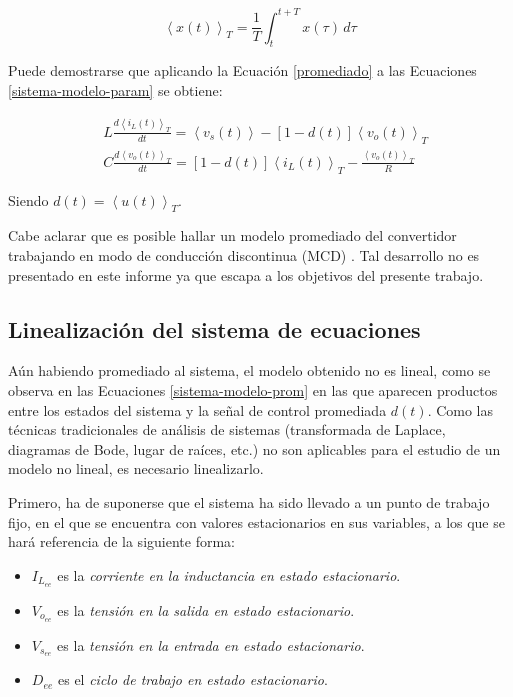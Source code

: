 \begin{equation}
  \left\langle x(t) \right\rangle_T = \frac{1}{T} \int_t^{t+T} x(\tau) \, d\tau
  \label{promediado}
\end{equation}

Puede demostrarse que aplicando la Ecuación \ref{promediado} a las Ecuaciones \ref{sistema-modelo-param} se obtiene:

\begin{equation}
  \boxed{
  \begin{split}
    & L \frac{d\left\langle i_L(t) \right\rangle_T}{dt} = \left\langle v_s(t) \right\rangle - \left[1-d(t)\right] \left\langle v_o(t) \right\rangle_T 
    \\
    & C \frac{d \left\langle v_o(t) \right\rangle_T}{dt} = \left[1-d(t)\right] \left\langle i_L(t) \right\rangle_T - \frac{\left\langle v_o(t) \right\rangle_T}{R}
  \end{split}
  }
  \label{sistema-modelo-prom}
\end{equation}

Siendo $d(t) = \left\langle u(t) \right\rangle_T$.

Cabe aclarar que es posible hallar un modelo promediado del convertidor trabajando en modo de conducción discontinua (MCD) \cite{jiansun}. Tal desarrollo no es presentado en este informe ya que escapa a los objetivos del presente trabajo.

\subsection{Linealización del sistema de ecuaciones}

Aún habiendo promediado al sistema, el modelo obtenido no es lineal, como se observa en las Ecuaciones \ref{sistema-modelo-prom} en las que aparecen productos entre los estados del sistema y la señal de control promediada $d(t)$. Como las técnicas tradicionales de análisis de sistemas (transformada de Laplace, diagramas de Bode, lugar de raíces, etc.) no son aplicables para el estudio de un modelo no lineal, es necesario linealizarlo.

Primero, ha de suponerse que el sistema ha sido llevado a un punto de trabajo fijo, en el que se encuentra con valores estacionarios en sus variables, a los que se hará referencia de la siguiente forma:

\begin{itemize}
  \item $I_{L_{ee}}$ es la \emph{corriente en la inductancia en estado estacionario}.
  \item $V_{o_{ee}}$ es la \emph{tensión en la salida en estado estacionario}.
  \item $V_{s_{ee}}$ es la \emph{tensión en la entrada en estado estacionario}.
  \item $D_{ee}$ es el \emph{ciclo de trabajo en estado estacionario}.
\end{itemize}

